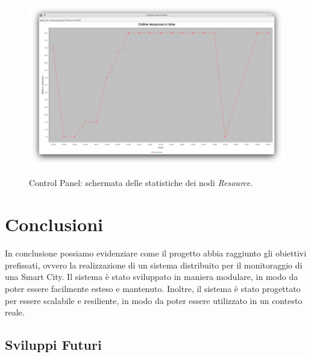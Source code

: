 \documentclass{scrartcl}
\begin{document}
\begin{figure}[H]
    \caption{Control Panel: schermata delle statistiche dei nodi \textit{Resource}.}
    \includegraphics[width=\textwidth]{../assets/images/control-panel-resources-stats.png}
    \label{fig:control-panel-resources-stats}
\end{figure}

\section{Conclusioni}

In conclusione possiamo evidenziare come il progetto abbia raggiunto gli obiettivi prefissati, ovvero la realizzazione di un sistema distribuito per il monitoraggio di una Smart City. Il sistema è stato sviluppato in maniera modulare, in modo da poter essere facilmente esteso e mantenuto. Inoltre, il sistema è stato progettato per essere scalabile e resiliente, in modo da poter essere utilizzato in un contesto reale.

\subsection{Sviluppi Futuri}
\end{document}
